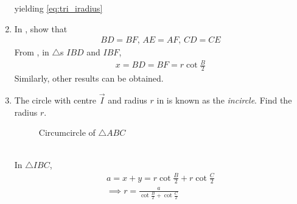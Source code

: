 \begin{enumerate}[label=\thesection.\arabic*.,ref=\thesection.\theenumi]
		yielding 
	\eqref{eq:tri_iradius}	
  \item In
	, show that
  \begin{align}
	  BD=BF ,\, 
	  AE=AF ,\, 
	  CD=CE 
  \end{align}
  \solution  From 
, in $\triangle$s $IBD$ and $IBF$, 
		\begin{align}
			x = BD = BF = r \cot \frac{B}{2}
		\end{align}
		Similarly, other results can be obtained.
\item The circle with centre $\vec{I}$ and radius $r$ in  
is known as the {\em incircle}.  Find the radius $r$.
\begin{figure}[!ht]
	\begin{center}
		\resizebox{\columnwidth}{!}{}
	\end{center}
	\caption{Circumcircle of $\triangle ABC$}
	\label{fig:tri_icircle}	
\end{figure}
\\
\solution
In $\triangle IBC$, 
		\begin{align}
			a = x + y = r\cot \frac{B}{2}+ r\cot \frac{C}{2}
			\\
			\implies r = \frac{a}{\cot \frac{B}{2}+ \cot \frac{C}{2}}
		\end{align}
\end{enumerate}

